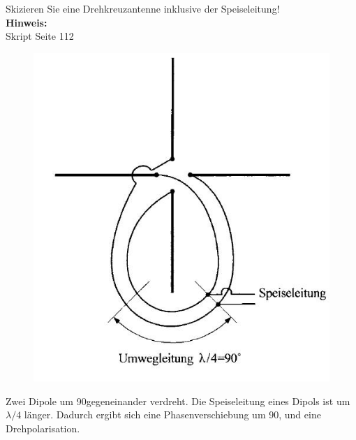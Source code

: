 \begin{question}[section=11,name={Drehkreuzantenne 2},difficulty=,quantity=6,type=thr,tags={20130314}]
	Skizieren Sie eine Drehkreuzantenne inklusive der Speiseleitung!
	\\ \textbf{Hinweis:}\\
	Skript Seite 112
\end{question}
\begin{solution}
	\begin{figure}[H]
		\includegraphics[width=14cm]{./opn/exm/thr/chp/11/3/bild.jpeg}
	\end{figure}
	Zwei Dipole um 90\degree gegeneinander verdreht. Die Speiseleitung eines Dipols ist um $\lambda/4$ länger. Dadurch ergibt sich eine Phasenverschiebung um 90\degree, und eine Drehpolarisation.
\end{solution}